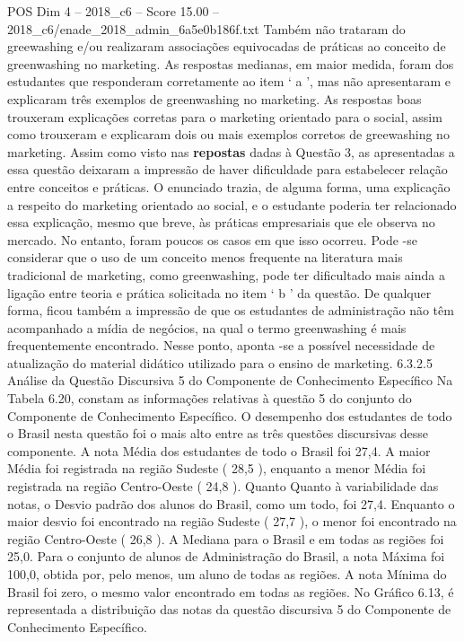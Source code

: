 \begin{textsample}{POS Dim 4 – 2018\_c6 – Score 15.00 – 2018\_c6/enade\_2018\_admin\_6a5e0b186f.txt}
Também não trataram do greewashing e/ou realizaram associações equivocadas de práticas ao conceito de greenwashing no marketing.
As respostas medianas, em maior medida, foram dos estudantes que responderam corretamente ao item ‘ a ’, mas não apresentaram e explicaram três exemplos de greenwashing no marketing.
As respostas boas trouxeram explicações corretas para o marketing orientado para o social, assim como trouxeram e explicaram dois ou mais exemplos corretos de greewashing no marketing.
Assim como visto nas \textbf{repostas} dadas à Questão 3, as apresentadas a essa questão deixaram a impressão de haver dificuldade para estabelecer relação entre conceitos e práticas.
O enunciado trazia, de alguma forma, uma explicação a respeito do marketing orientado ao social, e o estudante poderia ter relacionado essa explicação, mesmo que breve, às práticas empresariais que ele observa no mercado.
No entanto, foram poucos os casos em que isso ocorreu.
Pode -se considerar que o uso de um conceito menos frequente na literatura mais tradicional de marketing, como greenwashing, pode ter dificultado mais ainda a ligação entre teoria e prática solicitada no item ‘ b ’ da questão.
De qualquer forma, ficou também a impressão de que os estudantes de administração não têm acompanhado a mídia de negócios, na qual o termo greenwashing é mais frequentemente encontrado.
Nesse ponto, aponta -se a possível necessidade de atualização do material didático utilizado para o ensino de marketing. 6.3.2.5 Análise da Questão Discursiva 5 do Componente de Conhecimento Específico Na Tabela 6.20, constam as informações relativas à questão 5 do conjunto do Componente de Conhecimento Específico.
O desempenho dos estudantes de todo o Brasil nesta questão foi o mais alto entre as três questões discursivas desse componente.
A nota Média dos estudantes de todo o Brasil foi 27,4.
A maior Média foi registrada na região Sudeste ( 28,5 ), enquanto a menor Média foi registrada na região Centro-Oeste ( 24,8 ).
Quanto Quanto à variabilidade das notas, o Desvio padrão dos alunos do Brasil, como um todo, foi 27,4.
Enquanto o maior desvio foi encontrado na região Sudeste ( 27,7 ), o menor foi encontrado na região Centro-Oeste ( 26,8 ).
A Mediana para o Brasil e em todas as regiões foi 25,0.
Para o conjunto de alunos de Administração do Brasil, a nota Máxima foi 100,0, obtida por, pelo menos, um aluno de todas as regiões.
A nota Mínima do Brasil foi zero, o mesmo valor encontrado em todas as regiões.
No Gráfico 6.13, é representada a distribuição das notas da questão discursiva 5 do Componente de Conhecimento Específico.

\end{textsample}
